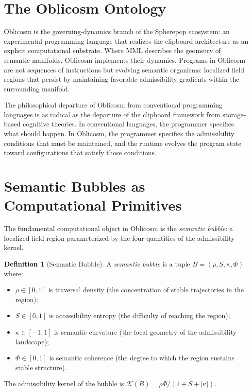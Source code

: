 \documentclass[12pt,oneside]{book}
\theoremstyle{plain}
\theoremstyle{definition}
\newtheorem{definition}[theorem]{Definition}
\theoremstyle{plain}
\begin{document}
\section{The Oblicosm Ontology}

Oblicosm is the governing-dynamics branch of the Spherepop ecosystem: an experimental programming language that realizes the clipboard architecture as an explicit computational substrate. Where MML describes the geometry of semantic manifolds, Oblicosm implements their dynamics. Programs in Oblicosm are not sequences of instructions but evolving semantic organisms: localized field regions that persist by maintaining favorable admissibility gradients within the surrounding manifold.

The philosophical departure of Oblicosm from conventional programming languages is as radical as the departure of the clipboard framework from storage-based cognitive theories. In conventional languages, the programmer specifies what should happen. In Oblicosm, the programmer specifies the admissibility conditions that must be maintained, and the runtime evolves the program state toward configurations that satisfy those conditions.

\section{Semantic Bubbles as Computational Primitives}

The fundamental computational object in Oblicosm is the \emph{semantic bubble}: a localized field region parameterized by the four quantities of the admissibility kernel.

\begin{definition}[Semantic Bubble]
A \emph{semantic bubble} is a tuple $B = (\rho, S, \kappa, \Phi)$ where:
\begin{itemize}[noitemsep]
\item $\rho \in [0,1]$ is traversal density (the concentration of stable trajectories in the region);
\item $S \in [0,1]$ is accessibility entropy (the difficulty of reaching the region);
\item $\kappa \in [-1,1]$ is semantic curvature (the local geometry of the admissibility landscape);
\item $\Phi \in [0,1]$ is semantic coherence (the degree to which the region sustains stable structure).
\end{itemize}
The admissibility kernel of the bubble is $\mathcal{K}(B) = \rho\Phi / (1 + S + |\kappa|)$.
\end{definition}
\end{document}

